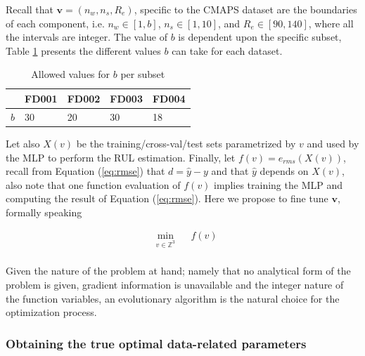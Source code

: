 \documentclass[12pt]{IEEEtran}%
\begin{document}
Recall that $\mathbf{v} = (n_w, n_s, R_e)$, specific to the CMAPS dataset are the boundaries of each component, i.e. $n_w \in \left[1, b\right]$, $n_s \in \left[1, 10\right]$, and $R_e \in \left[90, 140 \right]$, where all the intervals are integer. The value of $b$ is dependent upon the specific subset, Table \ref{table:b_values} presents the different values $b$ can take for each dataset.

\begin{table}[!htb]
\centering
\begin{tabular}{l | l l l l}
	\hline
	 & FD001 & FD002 & FD003 & FD004\\
  	\hline
  	$b$ & 30 & 20 & 30 & 18\\
  	\hline
\end{tabular}
\caption{Allowed values for $b$ per subset}
\label{table:b_values}
\end{table}

Let also $X(v)$ be the training/cross-val/test sets parametrized by $v$ and used by the MLP to perform the RUL estimation. Finally, let $f(v)=e_{rms}(X(v))$, recall from Equation (\ref{eq:rmse}) that $d = \hat{y} - y$ and that $\hat{y}$ depends on $X(v)$, also note that one function evaluation of $f(v)$ implies training the MLP and computing the result of Equation (\ref{eq:rmse}). Here we propose to fine tune $\mathbf{v}$, formally speaking

\begin{equation}
\begin{aligned}
& \underset{v \in \mathbb{Z}^3}{\text{min}}
& & f(v) \\
\end{aligned}
\label{eq:optimization_problem}
\end{equation}

Given the nature of the problem at hand; namely that no analytical form of the problem is given, gradient information is unavailable and the integer nature of the function variables, an evolutionary algorithm is the natural choice for the optimization process.

\subsubsection{Obtaining the true optimal data-related parameters}
\end{document}
